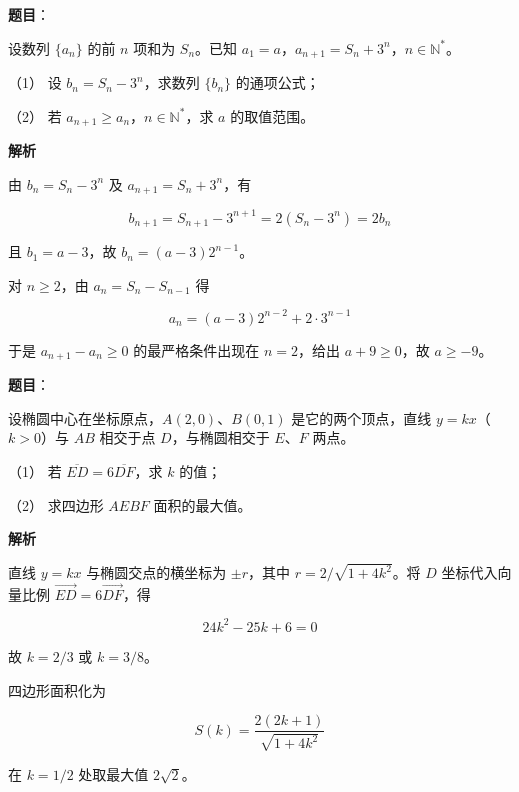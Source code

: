 \begin{answer}

\textbf{题目}：

设数列 $\{a_n\}$ 的前 $n$ 项和为 $S_n$。已知 $a_1=a$，$a_{n+1}=S_n+3^n$，$n\in\mathbb N^*$。

（1） 设 $b_n=S_n-3^n$，求数列 $\{b_n\}$ 的通项公式；

（2） 若 $a_{n+1}\geqslant a_n$，$n\in\mathbb N^*$，求 $a$ 的取值范围。

\textbf{解析}


由 $b_n=S_n-3^n$ 及 $a_{n+1}=S_n+3^n$，有

\nopagebreak[4]
\[
b_{n+1}=S_{n+1}-3^{n+1}=2(S_n-3^n)=2b_n
\]

且 $b_1=a-3$，故 $b_n=(a-3)2^{n-1}$。


对 $n\geqslant2$，由 $a_n=S_n-S_{n-1}$ 得

\nopagebreak[4]
\[
a_n=(a-3)2^{n-2}+2\cdot3^{n-1}
\]

于是 $a_{n+1}-a_n\geqslant0$ 的最严格条件出现在 $n=2$，给出 $a+9\geqslant0$，故 $a\geqslant-9$。



\end{answer}
\begin{answer}

\textbf{题目}：

设椭圆中心在坐标原点，$A(2,0)$、$B(0,1)$ 是它的两个顶点，直线 $y=kx$（$k>0$）与 $AB$ 相交于点 $D$，与椭圆相交于 $E\text{、}F$ 两点。

（1） 若 $\overline{ED}=6\overline{DF}$，求 $k$ 的值；

（2） 求四边形 $AEBF$ 面积的最大值。

\textbf{解析}


直线 $y=kx$ 与椭圆交点的横坐标为 $\pm r$，其中 $r=2/\sqrt{1+4k^2}$。将 $D$ 坐标代入向量比例 $\overrightarrow{ED}=6\overrightarrow{DF}$，得

\nopagebreak[4]
\[
24k^2-25k+6=0
\]

故 $k=2/3$ 或 $k=3/8$。


四边形面积化为

\nopagebreak[4]
\[
S(k)=\frac{2(2k+1)}{\sqrt{1+4k^2}}
\]

在 $k=1/2$ 处取最大值 $2\sqrt2$。



\end{answer}
